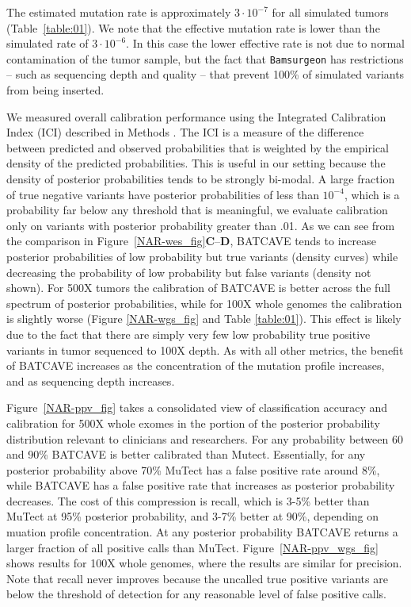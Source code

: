 \documentclass[a4,center,fleqn]{NAR}
\newcommand{\batcave}{BATCAVE }
\begin{document}
The estimated mutation rate is approximately $3\cdot10^{-7}$ for all simulated tumors (Table~\ref{table:01}).
We note that the effective mutation rate is lower than the simulated rate of $3\cdot10^{-6}$.
In this case the lower effective rate is not due to normal contamination of the tumor sample, but the fact that \texttt{Bamsurgeon} has restrictions -- such as sequencing depth and quality -- that prevent 100\% of simulated variants from being inserted. 

We measured overall calibration performance using the Integrated Calibration Index (ICI) described in Methods \citep{Austin2019}.
The ICI is a measure of the difference between predicted and observed probabilities that is weighted by the empirical density of the predicted probabilities.
This is useful in our setting because the density of posterior probabilities tends to be strongly bi-modal.
A large fraction of true negative variants have posterior probabilities of less than $10^{-4}$, which is a probability far below any threshold that is meaningful, we evaluate calibration only on variants with posterior probability greater than .01.
As we can see from the comparison in Figure~\ref{NAR-wes_fig}\textbf{C}--\textbf{D}, \batcave tends to increase posterior probabilities of low probability but true variants (density curves) while decreasing the probability of low probability but false variants (density not shown).
For 500X tumors the calibration of \batcave is better across the full spectrum of posterior probabilities, while for 100X whole genomes the calibration is slightly worse (Figure \ref{NAR-wgs_fig} and Table \ref{table:01}).
This effect is likely due to the fact that there are simply very few low probability true positive variants in tumor sequenced to 100X depth.
As with all other metrics, the benefit of \batcave increases as the concentration of the mutation profile increases, and as sequencing depth increases.

Figure~\ref{NAR-ppv_fig} takes a consolidated view of classification accuracy and calibration for 500X whole exomes in the portion of the posterior probability distribution relevant to clinicians and researchers.
For any probability between 60 and 90\% \batcave is better calibrated than Mutect.
Essentially, for any posterior probability above 70\% MuTect has a false positive rate around 8\%, while \batcave has a false positive rate that increases as posterior probability decreases.
The cost of this compression is recall, which is 3-5\% better than MuTect at 95\% posterior probability, and 3-7\% better at 90\%, depending on muation profile concentration.
At any posterior probability \batcave returns a larger fraction of all positive calls than MuTect.
Figure~\ref{NAR-ppv_wgs_fig} shows results for 100X whole genomes, where the results are similar for precision.
Note that recall never improves because the uncalled true positive variants are below the threshold of detection for any reasonable level of false positive calls.
\end{document}
